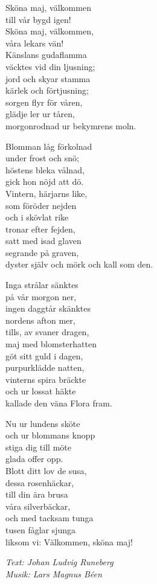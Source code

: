 \vspace{10pt}
Sköna maj, välkommen\\
till vår bygd igen! \\
Sköna maj, välkommen,\\
våra lekars vän!\\
Känslans gudaflamma\\
väcktes vid din ljusning;\\
jord och skyar stamma\\
kärlek och förtjusning;\\ 
sorgen flyr för våren,\\
glädje ler ur tåren,\\
morgonrodnad ur bekymrens moln.\par
\vspace{10pt}
Blomman låg förkolnad\\
under frost och snö;\\
höstens bleka vålnad,\\
gick hon nöjd att dö.\\
Vintern, härjarns like,\\ 
som föröder nejden\\
och i skövlat rike\\
tronar efter fejden,\\ 
satt med isad glaven\\
segrande på graven,\\
dyster själv och mörk och kall som den.\par
\vspace{10pt}
Inga strålar sänktes\\
på vår morgon ner,\\
ingen daggtår skänktes\\
nordens afton mer,\\
tills, av svaner dragen,\\
maj med blomsterhatten\\
göt sitt guld i dagen,\\
purpurklädde natten,\\
vinterns spira bräckte\\ 
och ur lossat häkte\\
kallade den väna Flora fram.\par
\vspace{10pt}
Nu ur lundens sköte\\
och ur blommans knopp\\ 
stiga dig till möte\\
glada offer opp.\\
Blott ditt lov de susa,\\
dessa rosenhäckar,\\
till din ära brusa\\
våra silverbäckar,\\
och med tacksam tunga\\
tusen fåglar sjunga\\
liksom vi: Välkommen, sköna maj!
\par
\vspace{10pt}
{\footnotesize\textit{Text: Johan Ludvig Runeberg\\ Musik: Lars Magnus Béen}}
